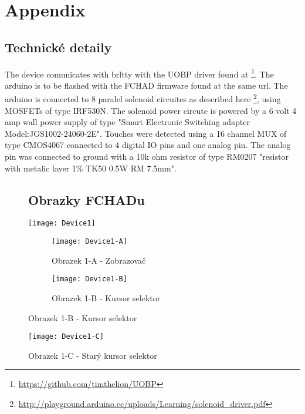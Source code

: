 \appendix
{}
\thispagestyle{empty}  
\renewcommand{\appendixname}{Appendix}%


\chapter*{Appendix}

\section{Technické detaily}

The device comunicates with brltty with the UOBP driver found at \footnote{\url{https://github.com/timthelion/UOBP}}.  The arduino is to be flashed with the FCHAD firmware found at the same url.  The arduino is connected to 8 paralel solenoid circuites as described here \footnote{\url{http://playground.arduino.cc/uploads/Learning/solenoid_driver.pdf}}, using MOSFETs of type IRF530N.  The solenoid power circute is powered by a 6 volt 4 amp wall power supply of type "Smart Electronic Switching adapter Model:JGS1002-24060-2E".  Touches were detected using a 16 channel MUX of type CMOS4067 connected to 4 digital IO pins and one analog pin.  The analog pin was connected to ground with a 10k ohm resistor of type RM0207 "resistor with metalic layer 1\% TK50 0.5W RM 7.5mm".


\clearpage
\begin{figure}
\section{Obrazky FCHADu}
\texttt{[image: Device1]}
\begin{subfigure}{.5\textwidth}
  \centering
  \texttt{[image: Device1-A]}
  \caption{Obrazek 1-A - Zobrazovač}
  \label{fig:sub1}
\end{subfigure}%
\begin{subfigure}{.5\textwidth}
  \centering
  \texttt{[image: Device1-B]}
  \caption{Obrazek 1-B - Kursor selektor}
  \label{fig:sub2}
\end{subfigure}

\label{fig:test}
\end{figure}
\begin{figure}
\texttt{[image: Device1-C]}
\caption{Obrazek 1-C - Starý kursor selektor}
\label{fig:sub2}
\end{figure}

